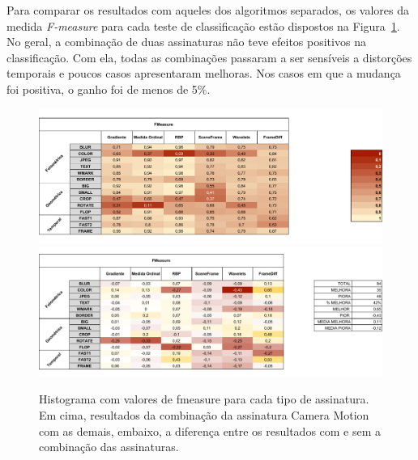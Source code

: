 Para comparar os resultados com aqueles dos algoritmos separados, os valores da medida \textit{F-measure} para cada teste de classificação estão dispostos na Figura~\ref{fig:compacao-metodos}. No geral, a combinação de duas assinaturas não teve efeitos positivos na classificação. Com ela, todas as combinações passaram a ser sensíveis a distorções temporais e poucos casos apresentaram melhoras. Nos casos em que a mudança foi positiva, o ganho foi de menos de 5\%. 

\begin{figure}[H]
	\caption{Histograma com valores de fmeasure para cada tipo de assinatura. Em cima, resultados da combinação da assinatura Camera Motion com as demais, embaixo, a diferença entre os resultados com e sem a combinação das assinaturas.}
	\label{fig:compacao-metodos}
	\includegraphics[width=\textwidth]{dados/figuras/experimentos/after_fmeasure.pdf}
	\includegraphics[width=\textwidth]{dados/figuras/experimentos/result_fmeasure.pdf}
\end{figure}




